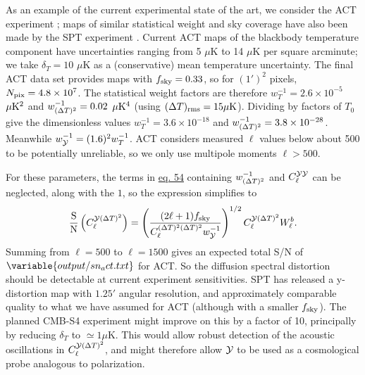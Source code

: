 \documentclass[fleqn,usenatbib]{mnras}
\begin{document}
    As an example of the current experimental state of the art, we consider the
    ACT experiment \citep{Coulton+2023}; maps of similar statistical weight and
    sky coverage have also been made by the SPT experiment \citep{SPTymap}.
    Current ACT maps of the blackbody temperature component have uncertainties
    ranging from 5 $\mu$K to 14 $\mu$K per square arcminute; we take $\delta_T =
    10$ $\mu$K as a (conservative) mean temperature uncertainty.  The final ACT
    data set provides maps with $f_{\rm sky} = 0.33$, so for $(1')^2$ pixels,
    $N_{\rm pix} = 4.8\times 10^7$.  The statistical weight factors are
    therefore 
    $w^{-1}_T = 2.6\times 10^{-5}$ $\mu{\rm K}^2$ and
    $w^{-1}_{({\Delta T})^2}=0.02$ $\mu{\rm K}^4$ (using $(\Delta T)_{\rm rms} =
    15\mu{\rm K}$).  Dividing by factors of $T_0$ give the dimensionless values
    $w^{-1}_T =3.6\times 10^{-18}$ and $w^{-1}_{({\Delta T})^2}= 3.8\times
    10^{-28}$.  Meanwhile $w^{-1}_{\cal Y} = (1.6)^2 w^{-1}_T$.  ACT considers
    measured $\ell$ values below about 500 to be potentially unreliable, so we
    only use multipole moments  
    $\ell > 500$.

    For these parameters, the terms in \hyperref[eq:cl_sn]{eq. 54} containing
    $w_{({\Delta T})^2}^{-1}$ and $C_\ell^{\mathcal{Y} \mathcal{Y}}$ can be neglected, along with
    the $1$, so the expression simplifies to 
    \begin{equation}
        \frac{\rm S}{\rm N}\left(C_\ell^{\mathcal{Y} ({\Delta T})^2}\right)
            = \left(\frac{(2\ell + 1)f_{\rm sky}}{C_\ell^{({\Delta T})^2({\Delta T})^2}w_{\mathcal{Y}}^{-1}}\right)^{1/2} 
            C_\ell^{\mathcal{Y} ({\Delta T})^2}W_\ell^b.
    \end{equation}
    Summing from $\ell=500$ to $\ell=1500$ gives an expected total S/N of
    $\variable{output/sn_act.txt}$ for ACT.  So the diffusion spectral
    distortion should be detectable at current experiment sensitivities.  SPT
    has released \citep{SPTymap} a y-distortion map with $1.25'$ angular
    resolution, and approximately comparable quality to what we have assumed for
    ACT (although with a smaller $f_{\rm sky}$).  The planned CMB-S4 experiment
    might improve on this by a factor of 10, principally by reducing $\delta_T$
    to $\simeq 1\mu$K.  This would allow robust detection of the acoustic
    oscillations in $C_\ell^{\mathcal{Y} ({\Delta T})^2}$, and might therefore allow ${\cal
    Y}$ to be used as a cosmological probe analogous to polarization.
\end{document}
